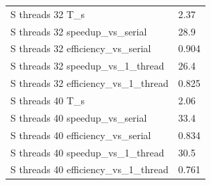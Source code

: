 \begin{tabular}{ll}
S threads 32 T\_s & 2.37 \\
S threads 32 speedup\_vs\_serial & 28.9 \\
S threads 32 efficiency\_vs\_serial & 0.904 \\
S threads 32 speedup\_vs\_1\_thread & 26.4 \\
S threads 32 efficiency\_vs\_1\_thread & 0.825 \\
S threads 40 T\_s & 2.06 \\
S threads 40 speedup\_vs\_serial & 33.4 \\
S threads 40 efficiency\_vs\_serial & 0.834 \\
S threads 40 speedup\_vs\_1\_thread & 30.5 \\
S threads 40 efficiency\_vs\_1\_thread & 0.761 \\
\end{tabular}
